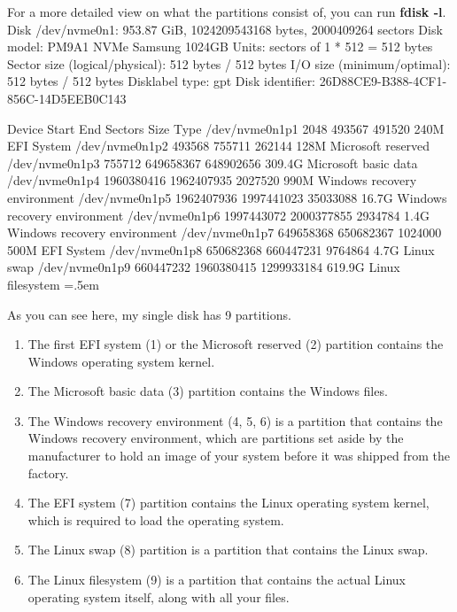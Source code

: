 \documentclass{article}
\newenvironment{cverbatim}
    {\SaveVerbatim{cverb}}
    {\endSaveVerbatim
    \flushleft\fboxrule=0pt\fboxsep=.5em
    \colorbox{cverbbg}{%
      \makebox[\dimexpr\linewidth-2\fboxsep][l]{\BUseVerbatim{cverb}}%
    }
    \endflushleft
  }
\begin{document}
  For a more detailed view on what the partitions consist of, you can run \textbf{fdisk -l}.
  \begin{cverbatim} 
  Disk /dev/nvme0n1: 953.87 GiB, 1024209543168 bytes, 2000409264 sectors
  Disk model: PM9A1 NVMe Samsung 1024GB               
  Units: sectors of 1 * 512 = 512 bytes
  Sector size (logical/physical): 512 bytes / 512 bytes
  I/O size (minimum/optimal): 512 bytes / 512 bytes
  Disklabel type: gpt
  Disk identifier: 26D88CE9-B388-4CF1-856C-14D5EEB0C143

  Device              Start        End    Sectors   Size Type
  /dev/nvme0n1p1       2048     493567     491520   240M EFI System
  /dev/nvme0n1p2     493568     755711     262144   128M Microsoft reserved
  /dev/nvme0n1p3     755712  649658367  648902656 309.4G Microsoft basic data
  /dev/nvme0n1p4 1960380416 1962407935    2027520   990M Windows recovery environment
  /dev/nvme0n1p5 1962407936 1997441023   35033088  16.7G Windows recovery environment
  /dev/nvme0n1p6 1997443072 2000377855    2934784   1.4G Windows recovery environment
  /dev/nvme0n1p7  649658368  650682367    1024000   500M EFI System
  /dev/nvme0n1p8  650682368  660447231    9764864   4.7G Linux swap
  /dev/nvme0n1p9  660447232 1960380415 1299933184 619.9G Linux filesystem
  \end{cverbatim}

  As you can see here, my single disk has 9 partitions. 
  \begin{enumerate} 
    \item The first EFI system (1) or the Microsoft reserved (2) partition contains the Windows operating system kernel. 
    \item The Microsoft basic data (3) partition contains the Windows files.
    \item  The Windows recovery environment (4, 5, 6) is a partition that contains the Windows recovery environment, which are partitions set aside by the manufacturer to hold an image of your system before it was shipped from the factory. 
    \item The EFI system (7) partition contains the Linux operating system kernel, which is required to load the operating system. 
    \item The Linux swap (8) partition is a partition that contains the Linux swap. 
    \item The Linux filesystem (9) is a partition that contains the actual Linux operating system itself, along with all your files.
  \end{enumerate}
\end{document}
